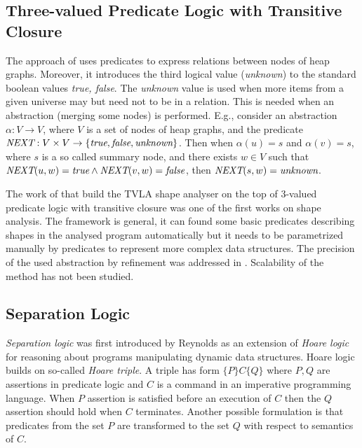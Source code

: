 	  \subsection{Three-valued Predicate Logic with Transitive Closure}
	  \label{subsec:tvl}
	  The approach of \cite{pale} uses predicates to express relations between nodes of heap graphs.
	  Moreover, it introduces the third logical value (\emph{unknown}) to the standard
	  boolean values \emph{true, false}. The \emph{unknown} value is used when
	  more items from a given universe may but need not to be in a relation.
	  This is needed when an abstraction (merging some nodes) is performed. E.g., consider
	  an abstraction $\alpha: V \rightarrow V$, where $V$ is a set of nodes
	  of heap graphs, and the predicate $\emph{NEXT}: V \times V\rightarrow\{\emph{true}, \emph{false}, \emph{unknown}\}$.
	  Then when $\alpha(u) = s$ and $\alpha(v) = s$, where $s$ is a so called summary node,
	  and there exists $w \in V$ such that $\emph{NEXT}(u,w) = \emph{true} \wedge
	  \emph{NEXT}(v,w) = \emph{false}$, then $\emph{NEXT}(s,w) = \emph{unknown}$.

	  The work of \cite{pale} that build the TVLA shape analyser on the top of 3-valued
	  predicate logic with transitive closure was one of the first works on shape analysis.
	  The framework is general, it can found some basic predicates describing shapes in the analysed
	  program automatically but it needs to be parametrized manually by predicates to
	  represent more complex data structures.
	  The precision of the used abstraction by refinement was addressed in \cite{cav05:mcpeak_necula, beyer:lazy_shape_analysis}.
	  Scalability of the method has not been studied.

	  \subsection{Separation Logic}

	  \emph{Separation logic} was first introduced by Reynolds \cite{Reynolds:SepLogic:02} as an extension
	  of \emph{Hoare logic} for reasoning about programs manipulating dynamic data structures.
	  Hoare logic builds on so-called \emph{Hoare triple}. A triple has form $\{P\}C\{Q\}$ where
	  $P,Q$ are assertions in predicate logic and $C$ is a command in an imperative programming language.
	  When $P$ assertion is satisfied before an execution of $C$ then the $Q$ assertion should hold
	  when $C$ terminates.
	  Another possible formulation is that predicates from the set $P$ are transformed to the set $Q$
	  with respect to semantics of $C$.

